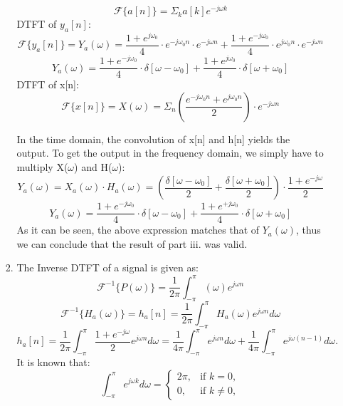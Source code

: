 \documentclass{article}
\begin{document}
\begin{enumerate}
\begin{enumerate}
\begin{enumerate}
                \[
                    \mathcal{F}\{a[n]\} = \Sigma_ka[k]e^{-j\omega k}
                \]
                DTFT of $y_a[n]$:
                \[
                    \mathcal{F}\{y_a[n]\} = Y_a(\omega) = \frac{1 + e^{j\omega_0}}{4} \cdot e^{-j\omega_0n}\cdot e^{-j\omega n} + \frac{1 + e^{-j\omega_0}}{4} \cdot e^{j\omega_0n}\cdot e^{-j\omega n}
                \]
                \[
                    Y_a(\omega) = \frac{1 + e^{-j\omega_0}}{4} \cdot \delta[\omega-\omega_0] + \frac{1 + e^{j\omega_0}}{4} \cdot \delta[\omega+\omega_0]
                \]
                DTFT of x[n]:
                \[
                    \mathcal{F}\{x[n]\} = X(\omega) = \Sigma_n\left(\frac{ e^{-j\omega_0 n} + e^{j\omega_0 n}}{2} \right)\cdot e^{-j\omega n}
                \]

                In the time domain, the convolution of x[n] and h[n] yields the output. To get the output in the frequency domain, we simply have to multiply X($\omega$) and H($\omega$):
                \[
                    Y_a(\omega) = X_a(\omega)\cdot H_a(\omega) = \left( \frac{\delta[\omega-\omega_0]}{2} + \frac{\delta[\omega+\omega_0]}{2} \right) \cdot \frac{1 + e^{-j\omega}}{2}
                \]
                \[
                    Y_a(\omega) = \frac{1 + e^{-j\omega_0}}{4} \cdot \delta[\omega-\omega_0] + \frac{1 + e^{+j\omega_0}}{4} \cdot \delta[\omega+\omega_0]
                \]
                As it can be seen, the above expression matches that of $Y_a(\omega)$, thus we can conclude that the result of part iii. was valid.
            \item
                The Inverse DTFT of a signal is given as:
                \[
                    \mathcal{F}^{-1}\{P(\omega)\} = \frac{1}{2\pi}\int_{-\pi}^{\pi}(\omega)e^{j\omega n}
                \]
                \[
                    \mathcal{F}^{-1}\{H_a(\omega)\} = h_a[n] = \frac{1}{2\pi} \int_{-\pi}^{\pi}H_a(\omega) e^{j\omega n} d\omega
                \]
                \[
                    h_a[n] = \frac{1}{2\pi} \int_{-\pi}^{\pi} \frac{1 + e^{-j\omega}}{2} e^{j\omega n} d\omega = \frac{1}{4\pi} \int_{-\pi}^{\pi} e^{j\omega n} d\omega + \frac{1}{4\pi} \int_{-\pi}^{\pi} e^{j\omega (n-1)} d\omega.
                \]
                It is known that: 
                \[
                    \int_{-\pi}^{\pi} e^{j\omega k} d\omega =
                    \begin{cases}
                        2\pi, & \text{if } k = 0, \\
                        0, & \text{if } k \neq 0,
                    \end{cases}
\]
\end{enumerate}
\end{enumerate}
\end{enumerate}
\end{document}
